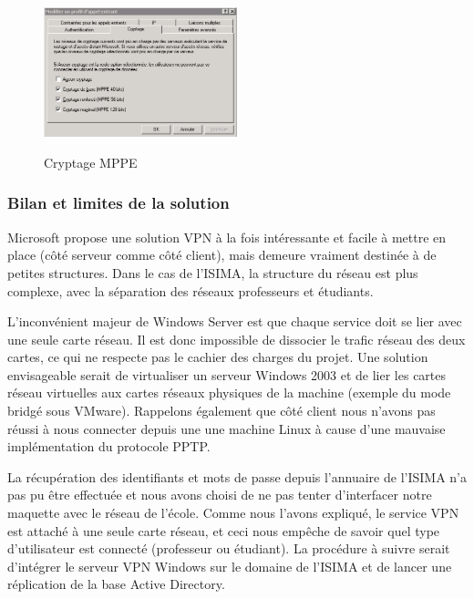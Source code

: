 \begin{figure}[H]
	\begin{center}
		\includegraphics[width=0.50\textwidth]{partie_2/screen_windows/cryptage.PNG}\\
	\end{center}
	\caption{Cryptage MPPE}
	\label{VPN_CRYPTAGE}
\end{figure}


\subsubsection{Bilan et limites de la solution}

Microsoft propose une solution VPN à la fois intéressante et facile à mettre en place (côté serveur comme côté client), mais demeure vraiment destinée à de petites structures. Dans le cas de l'ISIMA, la structure du réseau est plus complexe, avec la séparation des réseaux professeurs et étudiants.

L'inconvénient majeur de Windows Server est que chaque service doit se lier avec une seule carte réseau. Il est donc impossible de dissocier le trafic réseau des deux cartes, ce qui ne respecte pas le cachier des charges du projet. Une solution envisageable serait de virtualiser un serveur Windows 2003 et de lier les cartes réseau virtuelles aux cartes réseaux physiques de la machine (exemple du mode bridgé sous VMware). Rappelons également que côté client nous n'avons pas réussi à nous connecter depuis une une machine Linux à cause d'une mauvaise implémentation du protocole PPTP.

La récupération des identifiants et mots de passe depuis l'annuaire de l'ISIMA n'a pas pu être effectuée et nous avons choisi de ne pas tenter d'interfacer notre maquette avec le réseau de l'école. Comme nous l'avons expliqué, le service VPN est attaché à une seule carte réseau, et ceci nous empêche de savoir quel type d'utilisateur est connecté (professeur ou étudiant). La procédure à suivre serait d'intégrer le serveur VPN Windows sur le domaine de l'ISIMA et de lancer une réplication de la base Active Directory.

